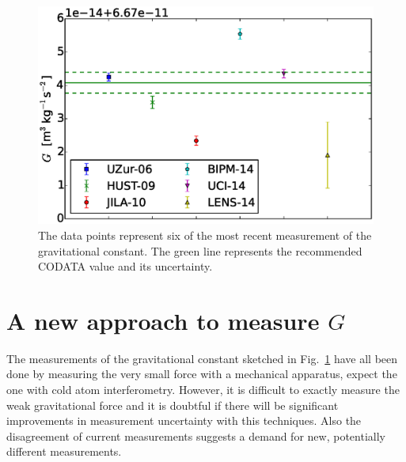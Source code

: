\documentclass[prb,preprint]{revtex4-1}
\begin{document}
\begin{figure}
	\centering
	\includegraphics[width=\textwidth]{img/plotGmeas}
	\caption{The data points represent six of the most recent measurement of the gravitational constant. The green line represents the recommended CODATA value and its uncertainty.}
	\label{fig:Gmeasurements}
\end{figure}

\section{A new approach to measure $G$}

The measurements of the gravitational constant sketched in Fig.~\ref{fig:Gmeasurements} have all been done by measuring the very small force with a mechanical apparatus, expect the one with cold atom interferometry. However, it is difficult to exactly measure the weak gravitational force and it is doubtful if there will be significant improvements in measurement uncertainty with this techniques. Also the disagreement of current measurements suggests a demand for new, potentially different measurements. \\
\end{document}
